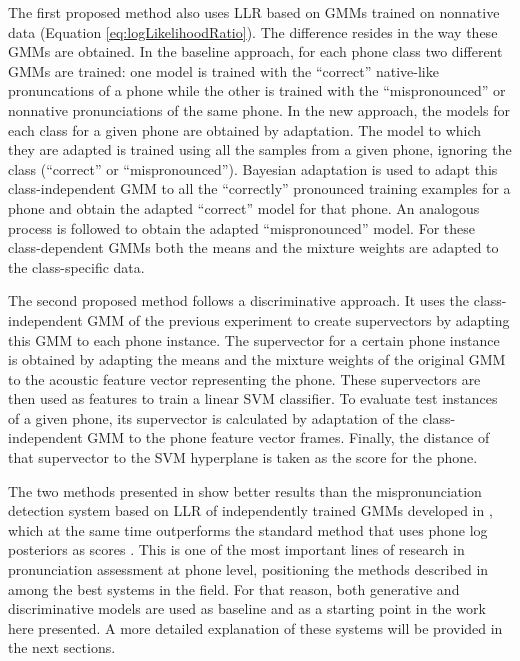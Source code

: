 The first proposed method also uses LLR based on GMMs trained
on nonnative data (Equation \ref{eq:logLikelihoodRatio}). The difference resides in the way these GMMs are obtained.
In the baseline approach, for each phone class two different GMMs are trained: one model is
trained with the ``correct'' native-like pronuncations of a phone while the other is trained
with the ``mispronounced'' or nonnative pronunciations of the same phone. In the new approach,
the models for each class for a given phone are obtained by adaptation. The model to which they
are adapted is trained using all the samples from a given phone, ignoring the class (``correct''
or ``mispronounced''). Bayesian adaptation \cite{ubm} is used to adapt this class-independent
GMM to all the ``correctly'' pronounced training examples for a phone and obtain the adapted
``correct'' model for that phone. An analogous process is followed to obtain the adapted
``mispronounced'' model. For these class-dependent GMMs both the means and the mixture weights 
are adapted to the class-specific data.

The second proposed method follows a discriminative approach. It uses the class-independent
GMM of the previous experiment to create supervectors by adapting this GMM to each phone instance.
The supervector for a certain phone instance is obtained by adapting the means and the mixture
weights of the original GMM to the acoustic feature vector representing the phone.
These supervectors are then used as features to train a linear SVM classifier.
To evaluate test instances of a given phone, its supervector is calculated by adaptation of the class-independent
GMM to the phone feature vector frames. Finally, the distance of that supervector to the SVM
hyperplane is taken as the score for the phone.

The two methods presented in \cite{main} show better results than the mispronunciation
detection system based on LLR of independently trained GMMs developed in
\cite{detection_phone_level_mispronunciation_learning}, which at the same time
outperforms the standard method that uses phone log posteriors
as scores \cite{pronunciation_scoring_phone_segments_instruction}. 
This is one of the most important lines of research in pronunciation assessment 
at phone level, positioning the methods described in \cite{main} among the best
systems in the field. For that reason, both generative and discriminative models are 
used as baseline and as a starting point in the work here presented. A more detailed 
explanation of these systems will be provided in the next sections.


